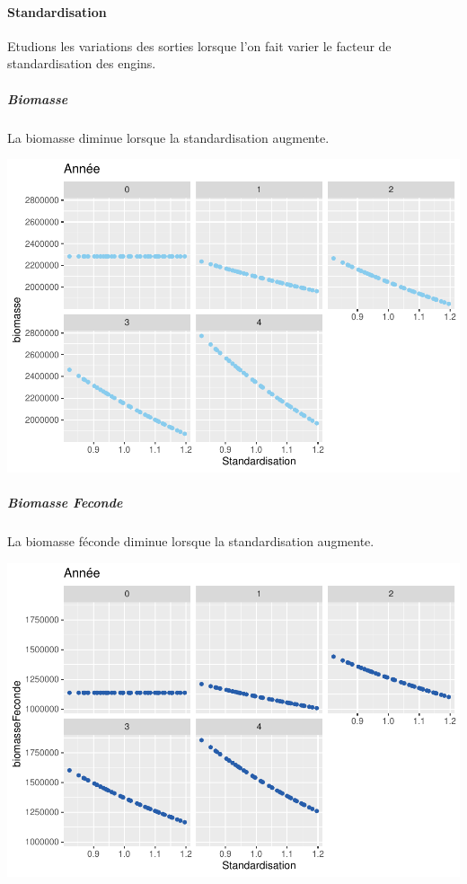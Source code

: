 \documentclass[
]{article}
\begin{document}
\hypertarget{standardisation}{%
\paragraph{Standardisation}\label{standardisation}}

Etudions les variations des sorties lorsque l'on fait varier le facteur
de standardisation des engins.

\hypertarget{biomasse-3}{%
\subparagraph{Biomasse}\label{biomasse-3}}

La biomasse diminue lorsque la standardisation augmente.

\includegraphics{rapport_files/figure-latex/aps-1.pdf}

\hypertarget{biomasse-feconde-2}{%
\subparagraph{Biomasse Feconde}\label{biomasse-feconde-2}}

La biomasse féconde diminue lorsque la standardisation augmente.

\includegraphics{rapport_files/figure-latex/cp-1.pdf}
\end{document}
